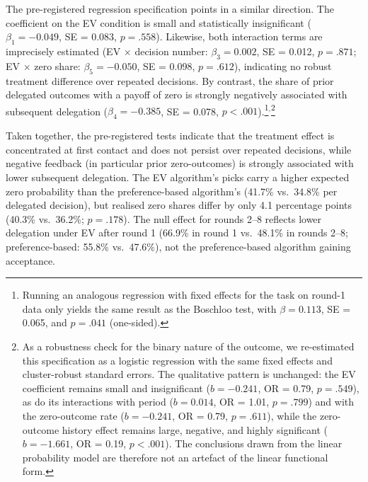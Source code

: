 \documentclass[a4paper, 12pt, fleqn]{article}
\theoremstyle{hypstyle}
\begin{document}
The pre-registered regression specification points in a similar direction. The coefficient on the EV condition is small and statistically insignificant ($\beta_1 = -0.049$, SE = 0.083, $p = .558$). Likewise, both interaction terms are imprecisely estimated (EV $\times$ decision number: $\beta_3 = 0.002$, SE = 0.012, $p = .871$; EV $\times$ zero share: $\beta_5 = -0.050$, SE = 0.098, $p = .612$), indicating no robust treatment difference over repeated decisions. By contrast, the share of prior delegated outcomes with a payoff of zero is strongly negatively associated with subsequent delegation ($\beta_4 = -0.385$, SE = 0.078, $p < .001$).\footnote{Running an analogous regression with fixed effects for the task on round-1 data only yields the same result as the Boschloo test, with $\beta = 0.113$, SE = 0.065, and $p = .041$ (one-sided).}$^,$\footnote{ As a robustness check for the binary nature of the outcome, we re-estimated this specification as a logistic regression with the same fixed effects and cluster-robust standard errors. The qualitative pattern is unchanged: the EV coefficient remains small and insignificant ($b = -0.241$, OR = 0.79, $p = .549$), as do its interactions with period ($b = 0.014$, OR = 1.01, $p = .799$) and with the zero-outcome rate ($b = -0.241$, OR = 0.79, $p = .611$), while the zero-outcome history effect remains large, negative, and highly significant ($b = -1.661$, OR = 0.19, $p < .001$). The conclusions drawn from the linear probability model are therefore not an artefact of the linear functional form.}

Taken together, the pre-registered tests indicate that the treatment effect is concentrated at first contact and does not persist over repeated decisions, while negative feedback (in particular prior zero-outcomes) is strongly associated with lower subsequent delegation. The EV algorithm's picks carry a higher expected zero probability than the preference-based algorithm's (41.7\% vs.\ 34.8\% per delegated decision), but realised zero shares differ by only 4.1 percentage points (40.3\% vs.\ 36.2\%; $p = .178$). The null effect for rounds 2--8 reflects lower delegation under EV after round 1 (66.9\% in round 1 vs.\ 48.1\% in rounds 2--8; preference-based: 55.8\% vs.\ 47.6\%), not the preference-based algorithm gaining acceptance.
\end{document}
